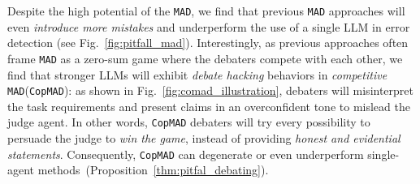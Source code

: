 \documentclass{article} %
\newcommand{\copmad}[0]{\texttt{CopMAD}\xspace}
\newcommand{\mad}[0]{\texttt{MAD}\xspace}
\newcommand{\my}[1]{{\color{deepgreen}{(Mao: #1)}}}
\begin{document}
Despite the high potential of the \mad, we find that previous \mad approaches will even \textit{introduce more mistakes} and underperform the use of a single LLM in error detection (see Fig.~\ref{fig:pitfall_mad}). 
Interestingly, as previous approaches often frame \mad as a zero-sum game where the debaters compete with each other, we find that stronger LLMs will exhibit \textit{debate hacking} behaviors in \textit{competitive} \mad (\copmad): as shown in Fig.~\ref{fig:comad_illustration}, debaters will misinterpret the task requirements and present claims in an overconfident tone to mislead the judge agent.
In other words, \copmad debaters will try every possibility to persuade the judge to \textit{win the game}, instead of providing \textit{honest and evidential statements}. Consequently, \copmad can degenerate or even underperform single-agent methods~(Proposition~\ref{thm:pitfal_debating}).
\end{document}
